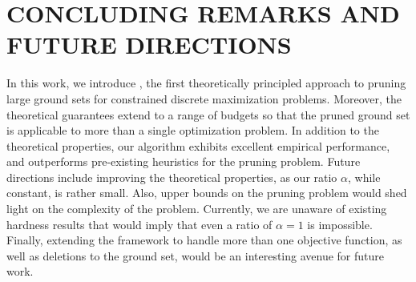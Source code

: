 \section{CONCLUDING REMARKS AND FUTURE DIRECTIONS}  \label{sec:con}
In this work, we introduce \qs, the first theoretically principled
approach to pruning large ground sets for constrained discrete maximization
problems. Moreover, the theoretical guarantees extend to a range of budgets so
that the pruned ground set is applicable to more than a single optimization problem.
In addition to the theoretical properties, our algorithm exhibits excellent empirical
performance, and outperforms pre-existing heuristics for the pruning problem.
Future directions include improving the theoretical properties, as our ratio $\alpha$,
while constant, is rather small. Also, upper bounds on the pruning problem would shed
light on the complexity of the problem. Currently, we are unaware of existing hardness
results that would imply that even a ratio of $\alpha = 1$ is impossible.
Finally, extending the framework to handle more than one objective function, as well
as deletions to the ground set, would be an interesting avenue for future work. 
\clearpage

